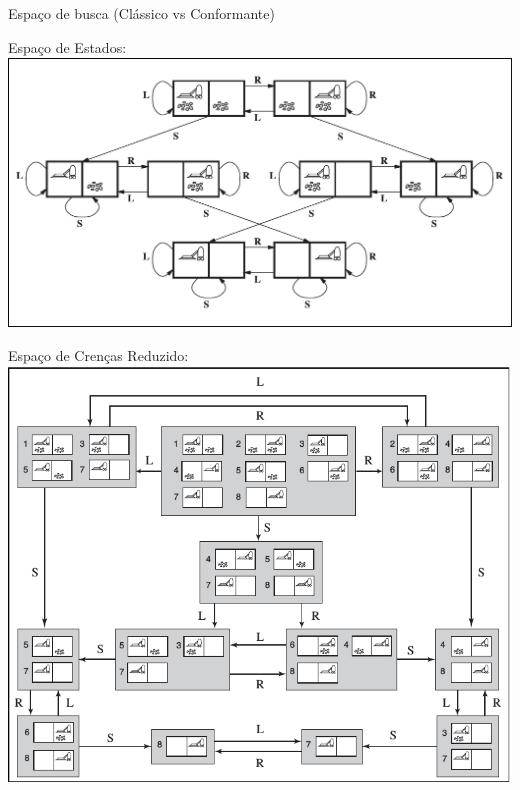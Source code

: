 \begin{frame}{Espaço de busca (Clássico vs Conformante)}

    \begin{multicols}{2}
        \centering
    
        Espaço de Estados:
        \includegraphics[scale=0.2]{images/space_of_states.png}
    \columnbreak
    
        Espaço de Crenças Reduzido:
        \includegraphics[scale=0.28]{images/belief_space.png}
    \end{multicols}
    
\end{frame}


